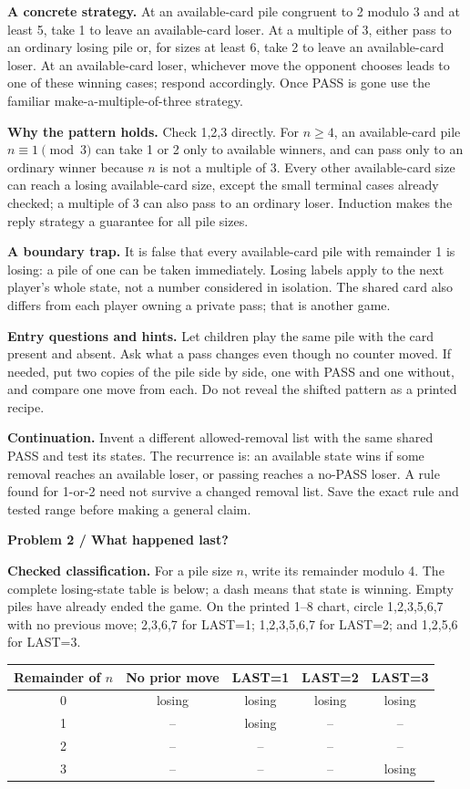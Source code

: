 \documentclass[11pt]{article}
\newcommand{\parttitle}[1]{{\large\bfseries\color{ink}#1}\par}
\newcommand{\labelled}[2]{\textbf{#1} #2\par}
\begin{document}
\labelled{A concrete strategy.}{At an available-card pile congruent to 2 modulo 3 and at least 5, take 1 to leave an available-card loser. At a multiple of 3, either pass to an ordinary losing pile or, for sizes at least 6, take 2 to leave an available-card loser. At an available-card loser, whichever move the opponent chooses leads to one of these winning cases; respond accordingly. Once PASS is gone use the familiar make-a-multiple-of-three strategy.}
\labelled{Why the pattern holds.}{Check 1,2,3 directly. For $n\ge4$, an available-card pile $n\equiv1\pmod3$ can take 1 or 2 only to available winners, and can pass only to an ordinary winner because $n$ is not a multiple of 3. Every other available-card size can reach a losing available-card size, except the small terminal cases already checked; a multiple of 3 can also pass to an ordinary loser. Induction makes the reply strategy a guarantee for all pile sizes.}
\labelled{A boundary trap.}{It is false that every available-card pile with remainder 1 is losing: a pile of one can be taken immediately. Losing labels apply to the next player's whole state, not a number considered in isolation. The shared card also differs from each player owning a private pass; that is another game.}
\labelled{Entry questions and hints.}{Let children play the same pile with the card present and absent. Ask what a pass changes even though no counter moved. If needed, put two copies of the pile side by side, one with PASS and one without, and compare one move from each. Do not reveal the shifted pattern as a printed recipe.}
\labelled{Continuation.}{Invent a different allowed-removal list with the same shared PASS and test its states. The recurrence is: an available state wins if some removal reaches an available loser, or passing reaches a no-PASS loser. A rule found for 1-or-2 need not survive a changed removal list. Save the exact rule and tested range before making a general claim.}
\newpage
\parttitle{Problem 2 / What happened last?}
\labelled{Checked classification.}{For a pile size $n$, write its remainder modulo 4. The complete losing-state table is below; a dash means that state is winning. Empty piles have already ended the game. On the printed 1--8 chart, circle 1,2,3,5,6,7 with no previous move; 2,3,6,7 for LAST=1; 1,2,3,5,6,7 for LAST=2; and 1,2,5,6 for LAST=3.}
\begin{center}\begin{tabular}{c|cccc}
Remainder of $n$ & No prior move & LAST=1 & LAST=2 & LAST=3\\\hline
0 & losing & losing & losing & losing\\
1 & -- & losing & -- & --\\
2 & -- & -- & -- & --\\
3 & -- & -- & -- & losing
\end{tabular}\end{center}
\end{document}
